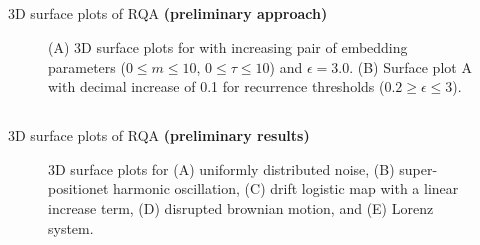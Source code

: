 \subsection{}
{

\begin{frame}{3D surface plots of RQA {\bf (preliminary approach)}
}

    \begin{figure}
	\caption{(A) 3D surface plots for 
	with increasing pair of embedding parameters 
	($0 \le m \le 10$, $0 \le \tau \le 10$) and $\epsilon=3.0$.
	(B) Surface plot A with decimal increase of 0.1 
	for recurrence thresholds ($ 0.2 \ge \epsilon \le 3 $).
	} 
   \end{figure}
		
\end{frame}
}



\subsection{}
{

\begin{frame}{3D surface plots of RQA
	{\bf (preliminary results)}
}

    \begin{figure}
	\caption{3D surface plots for 
		(A) uniformly distributed noise,
		(B) super-positionet harmonic oscillation,
		(C) drift logistic map with a linear increase term,
		(D) disrupted brownian motion, and
		(E) Lorenz system.
		} 
   \end{figure}
		
\end{frame}
}






